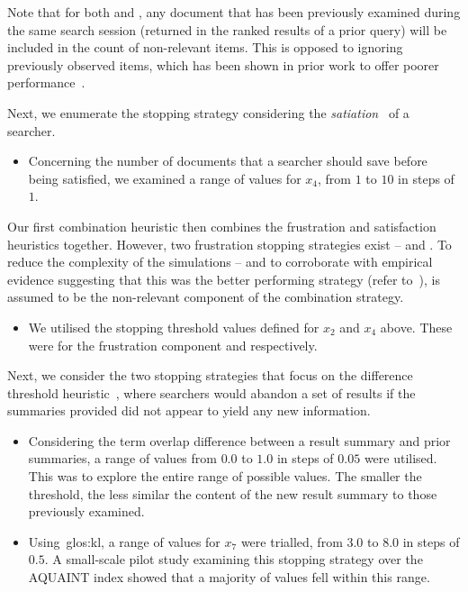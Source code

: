 Note that for both  and , any document that has been previously examined during the same search session (returned in the ranked results of a prior query) will be included in the count of non-relevant items. This is opposed to ignoring previously observed items, which has been shown in prior work to offer poorer performance~\citep{maxwell2015stopping_strategies}.

Next, we enumerate the stopping strategy considering the \emph{satiation}~\citep{simon1955satiation} of a searcher.

\begin{itemize}
    \item{ Concerning the number of documents that a searcher should save before being satisfied, we examined a range of values for $x_4$, from $1$ to $10$ in steps of $1$.}
\end{itemize}

Our first combination heuristic then combines the frustration and satisfaction heuristics together. However, two frustration stopping strategies exist --  and . To reduce the complexity of the simulations -- and to corroborate with empirical evidence suggesting that this was the better performing strategy (refer to~\cite{maxwell2015stopping_strategies}),  is assumed to be the non-relevant component of the combination strategy.

\begin{itemize}
    \item{ We utilised the stopping threshold values defined for $x_2$ and $x_4$ above. These were for the frustration component  and  respectively.}
\end{itemize}

Next, we consider the two stopping strategies that focus on the difference threshold heuristic~\citep{nickles1995judgment}, where searchers would abandon a set of results if the summaries provided did not appear to yield any new information.

\begin{itemize}
    \item{ Considering the term overlap difference between a result summary and prior summaries, a range of values from $0.0$ to $1.0$ in steps of $0.05$ were utilised. This was to explore the entire range of possible values. The smaller the threshold, the less similar the content of the new result summary to those previously examined.}
    
    \item{ Using~\gls{glos:kl}, a range of values for $x_7$ were trialled, from $3.0$ to $8.0$ in steps of $0.5$. A small-scale pilot study examining this stopping strategy over the AQUAINT index showed that a majority of values fell within this range.}
\end{itemize}

